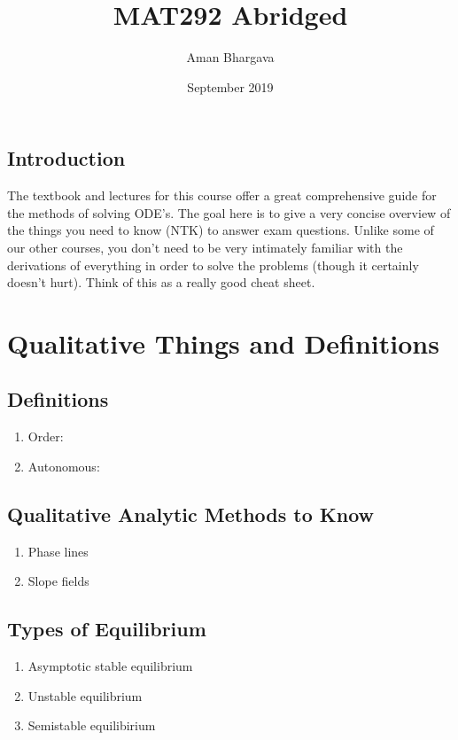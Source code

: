 \documentclass[a4paper,12pt]{report}
\begin{document}
\title{MAT292 Abridged}
\author{Aman Bhargava}
\date{September 2019}
\maketitle

\tableofcontents

\section{Introduction}
The textbook and lectures for this course offer a great comprehensive guide for the 
methods of solving ODE's. The goal here is to give a very concise overview of the things you 
need to know (NTK) to answer exam questions. Unlike
some of our other courses, you don't need to be very intimately familiar with the derivations
of everything in order to solve the problems (though it certainly doesn't hurt). Think of this 
as a really good cheat sheet.

\chapter{Qualitative Things and Definitions}
\section{Definitions}
\begin{enumerate}
\item Order:
\item Autonomous:
\end{enumerate}


\section{Qualitative Analytic Methods to Know}
\begin{enumerate}
\item Phase lines
\item Slope fields
\end{enumerate}

\section{Types of Equilibrium}
\begin{enumerate}
\item Asymptotic stable equilibrium 
\item Unstable equilibrium 
\item Semistable equilibirium
\end{enumerate}
\end{document}
